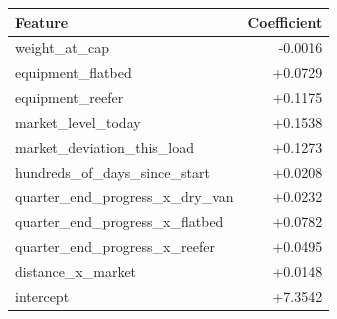 \begin{tabular}{lr}
\toprule
Feature & Coefficient \\
\midrule
weight\_at\_cap & -0.0016 \\
equipment\_flatbed & +0.0729 \\
equipment\_reefer & +0.1175 \\
market\_level\_today & +0.1538 \\
market\_deviation\_this\_load & +0.1273 \\
hundreds\_of\_days\_since\_start & +0.0208 \\
quarter\_end\_progress\_x\_dry\_van & +0.0232 \\
quarter\_end\_progress\_x\_flatbed & +0.0782 \\
quarter\_end\_progress\_x\_reefer & +0.0495 \\
distance\_x\_market & +0.0148 \\
intercept & +7.3542 \\
\bottomrule
\end{tabular}

